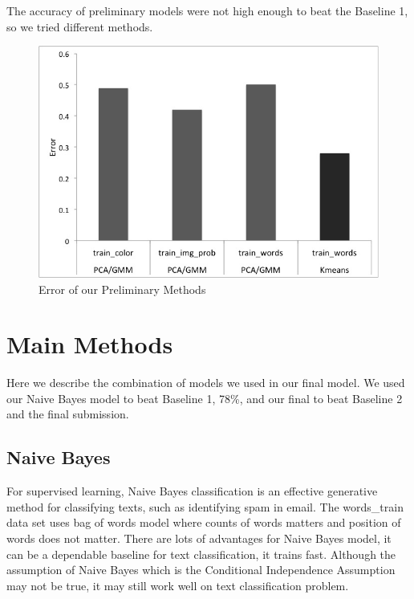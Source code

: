 \documentclass[]{article}
\begin{document}
The accuracy of preliminary models were not high enough to beat the Baseline 1, so we tried different methods.
 

\begin{figure}
	\centering
  \includegraphics[scale=0.4]{trainingerror.jpg}
  \caption{Error of our Preliminary Methods}
  \label{fig:Error}
\end{figure}

\section{Main Methods}

Here we describe the combination of models we used in our final model. We used our Naive Bayes model to beat Baseline 1, 78\%, and our final to beat Baseline 2 and the final submission. 


\subsection{Naive Bayes}

For supervised learning, Naive Bayes classification is an effective generative method for classifying texts, such as identifying spam in email. The words\_train data set uses bag of words model where counts of words matters and position of words does not matter. There are lots of advantages for Naive Bayes model, it can be a dependable baseline for text classification, it trains fast. Although the assumption of Naive Bayes which is the Conditional Independence Assumption may not be true, it may still work well on text classification problem.\\\\
\end{document}

